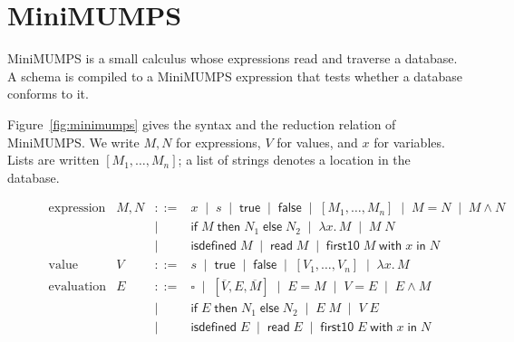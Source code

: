 \documentclass[11pt]{article}
\newcommand{\kw}[1]{\mathsf{#1}}
\newcommand{\true}{\kw{true}}
\newcommand{\false}{\kw{false}}
\newcommand{\ifte}[3]{\kw{if}\;#1\;\kw{then}\;#2\;\kw{else}\;#3}
\newcommand{\isdef}[1]{\kw{isdefined}\;#1}
\newcommand{\readm}[1]{\kw{read}\;#1}
\newcommand{\firstten}[3]{\kw{first10}\;#1\;\kw{with}\;#2\;\kw{in}\;#3}
\theoremstyle{remark}
\begin{document}
\FloatBarrier
\section{MiniMUMPS}
\label{sec:minimumps}

MiniMUMPS is a small calculus whose expressions read and traverse a database. A schema is compiled
to a MiniMUMPS expression that tests whether a database conforms to it.

Figure~\ref{fig:minimumps} gives the syntax and the reduction relation of MiniMUMPS. We write
$M, N$ for expressions, $V$ for values, and $x$ for variables. Lists are written
$[M_1, \ldots, M_n]$; a list of strings denotes a location in the database.

\begin{figure}[!htbp]
\[
\begin{array}{llcl}
\text{expression} & M, N & ::= & x \;\mid\; s \;\mid\; \true \;\mid\; \false
   \;\mid\; [M_1, \ldots, M_n] \;\mid\; M = N \;\mid\; M \wedge N \\
  & & \mid & \ifte{M}{N_1}{N_2} \;\mid\; \lambda x.\,M \;\mid\; M\;N \\
  & & \mid & \isdef{M} \;\mid\; \readm{M} \;\mid\; \firstten{M}{x}{N} \\[4pt]
\text{value} & V & ::= & s \;\mid\; \true \;\mid\; \false \;\mid\; [V_1, \ldots, V_n]
   \;\mid\; \lambda x.\,M \\[4pt]
\text{evaluation context} & E & ::= & \square \;\mid\; [\overline{V}, E, \overline{M}]
   \;\mid\; E = M \;\mid\; V = E \;\mid\; E \wedge M \\
  & & \mid & \ifte{E}{N_1}{N_2} \;\mid\; E\;M \;\mid\; V\;E \\
  & & \mid & \isdef{E} \;\mid\; \readm{E} \;\mid\; \firstten{E}{x}{N}
\end{array}
\]


\end{figure}
\end{document}
